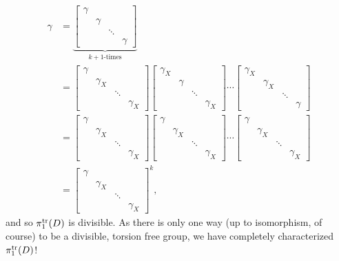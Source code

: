 \begin{align*}
  \gamma &= \underbrace{\begin{bmatrix} \gamma &&&\\ &\gamma&\\&&\ddots\\&&&\gamma\end{bmatrix}}_{k+1\textrm{-times}}\\
    &=\begin{bmatrix} \gamma &&&\\ &\gamma_X&\\&&\ddots\\&&&\gamma_X\end{bmatrix}
      \begin{bmatrix} \gamma_X &&&\\ &\gamma&\\&&\ddots\\&&&\gamma_X\end{bmatrix}\cdots
      \begin{bmatrix} \gamma_X &&&\\ &\gamma_X&\\&&\ddots\\&&&\gamma\end{bmatrix}\\
    &=\begin{bmatrix} \gamma &&&\\ &\gamma_X&\\&&\ddots\\&&&\gamma_X\end{bmatrix}
      \begin{bmatrix} \gamma &&&\\ &\gamma_X&\\&&\ddots\\&&&\gamma_X\end{bmatrix}\cdots
      \begin{bmatrix} \gamma &&&\\ &\gamma_X&\\&&\ddots\\&&&\gamma_X\end{bmatrix}\\
    &=\begin{bmatrix} \gamma &&&\\ &\gamma_X&\\&&\ddots\\&&&\gamma_X\end{bmatrix}^k,
\end{align*}
and so \(\pi_1^{\operatorname{tr}}(D)\) is divisible. As there is only one way (up to
isomorphism, of course) to be a divisible, torsion free group, we
have completely characterized \(\pi_1^{\operatorname{tr}}(D)\)!

